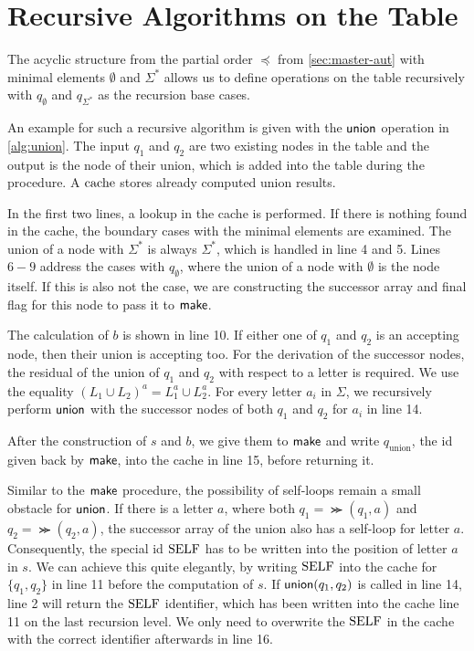 

\section{Recursive Algorithms on the Table}
The acyclic structure from the partial order $\preceq$ from \autoref{sec:master-aut} with minimal elements $\emptyset$ and $\Sigma^{*}$ allows us to define operations on the table recursively with $q_{\emptyset}$ and $q_{\Sigma^{*}}$ as the recursion base cases.
\par
An example for such a recursive algorithm is given with the $\operatorname{\textsf{union}}$ operation in \autoref{alg:union}. The input $q_{1}$ and $q_{2}$ are two existing nodes in the table and the output is the node of their union, which is added into the table during the procedure. A $\mathrm{cache}$ stores already computed union results.
\par
In the first two lines, a lookup in the cache is performed. If there is nothing found in the cache, the boundary cases with the minimal elements are examined. The union of a node with $\Sigma^{*}$ is always $\Sigma^{*}$, which is handled in line 4 and 5. Lines $6-9$ address the cases with $q_{\emptyset}$, where the union of a node with $\emptyset$ is the node itself. 
If this is also not the case, we are constructing the successor array and final flag for this node to pass it to $\operatorname{\textsf{make}}$. 
\par 
The calculation of $b$ is shown in line 10. If either one of $q_{1}$ and $q_{2}$ is an accepting node, then their union is accepting too. For the derivation of the successor nodes, the residual of the union of $q_{1}$ and $q_{2}$ with respect to a letter is required. We use the equality $(L_{1} \cup L_{2})^{a} = L_{1}^{a} \cup L_{2}^{a}$. For every letter $a_{i}$ in $\Sigma$, we recursively perform $\operatorname{\textsf{union}}$ with the successor nodes of both $q_{1}$ and $q_{2}$ for $a_{i}$ in line 14.
\par 
After the construction of $s$ and $b$, we give them to $\operatorname{\textsf{make}}$ and write $q_{\text{union}}$, the id given back by $\operatorname{\textsf{make}}$, into the cache in line 15, before returning it.
\par
Similar to the $\operatorname{\textsf{make}}$ procedure, the possibility of self-loops remain a small obstacle for $\operatorname{\textsf{union}}$. If there is a letter $a$, where both $q_{1} = \Succ(q_{1},a)$ and $q_{2} = \Succ(q_{2},a)$, the successor array of the union also has a self-loop for letter $a$. Consequently, the special id $\mathrm{SELF}$ has to be written into the position of letter $a$ in $s$. We can achieve this quite elegantly, by writing $\mathrm{SELF}$ into the cache for $\{q_{1},q_{2}\}$ in line 11 before the computation of $s$. If $\operatorname{\textsf{union}}(q_{1},q_{2})$ is called in line 14, line 2 will return the $\mathrm{SELF}$ identifier, which has been written into the cache line 11 on the last recursion level. We only need to overwrite the $\mathrm{SELF}$ in the cache with the correct identifier afterwards in line 16.

